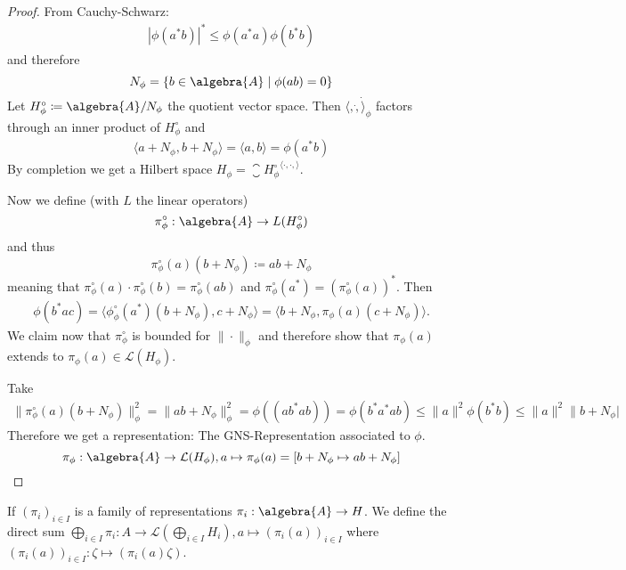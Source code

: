 \documentclass[a4paper]{article}
\begin{document}
\begin{proof}
	From Cauchy-Schwarz: 
	\begin{align*}
		|\phi(a^* b)|^* \leq \phi(a^* a) \phi(b^* b)
	\end{align*}
	and therefore
	\begin{equation*}
		N_\phi = \{ b \in \algebra{A} \mid \phi(ab) = 0 \}
	\end{equation*}
	Let $H_\phi^\circ \coloneq \algebra{A} / N_\phi$ the quotient vector space.
	Then $\langle, \dot, \dot \rangle_\phi$ factors through an inner product of $H_\phi^\circ$ and 
	\begin{align*}
		\langle a + N_\phi, b + N_\phi \rangle = \langle a, b \rangle  =\phi(a^* b)
	\end{align*}
	By completion we get a Hilbert space $H_\phi= \closure{H^\circ_\phi}^{\langle \cdot, \cdot, \rangle}$.

	Now we define (with $L$ the linear operators)
	\begin{equation*}
		\pi_\phi^\circ: \algebra{A} \to L(H_\phi^\circ)
	\end{equation*}
	and thus
	\begin{equation*}
		\pi_\phi^\circ(a) (b + N_\phi)\coloneq ab + N_\phi
	\end{equation*}
	meaning that $\pi_\phi^\circ (a) \cdot \pi_\phi^\circ(b) = \pi_\phi^\circ (ab)$ and $\pi_\phi^\circ(a^*) = (\pi_\phi^\circ(a))^*$. Then
	\begin{align}
		\phi(b^* a c) = \langle \phi_\phi^\circ (a^*) (b + N_\phi), c + N_\phi \rangle = \langle b + N_\phi, \pi_\phi(a)(c + N_\phi) \rangle\text{.}
	\end{align}
	We claim now that $\pi_\phi^\circ$ is bounded for $\|\cdot\|_\phi$ and therefore show that $\pi_\phi(a)$ extends to  $\pi_\phi(a) \in \mathcal{L}(H_\phi)$. 

	Take 
	\begin{align*}
		\|\pi_\phi^\circ(a)(b + N_\phi)\|_\phi^2 = \|ab + N_\phi\|_\phi^2 = \phi((ab^* ab)) = \phi(b^* a^* a b) \leq \|a\|^2 \phi(b^* b) \leq \|a\|^2 \|b + N_\phi|
	\end{align*}
	Therefore we get a representation: The GNS-Representation associated to $\phi$.
	\begin{equation*}
		\pi_\phi: \algebra{A} \to \mathcal{L}(H_\phi), a \mapsto \pi_\phi(a) = [b + N_\phi \mapsto ab + N_\phi] 
	\end{equation*}
 \end{proof}

 If $(\pi_i)_{i \in I}$ is a family of representations $\pi_i: \algebra{A} \to H$.
 We define the direct sum $\bigoplus_{i \in I} \pi_i: A \to \mathcal{L}(\bigoplus_{i \in I} H_i), a \mapsto (\pi_i(a))_{i \in I}$ where $(\pi_i(a))_{i \in I}: \zeta \mapsto (\pi_i(a)\zeta)$.
\end{document}
